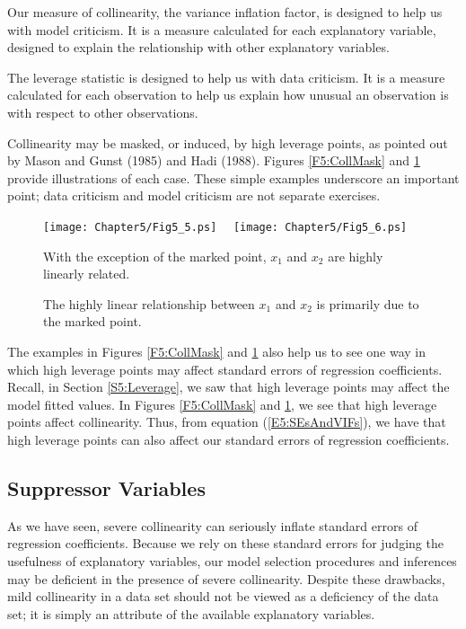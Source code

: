 Our measure of collinearity, the variance inflation factor, is designed to
help us with model criticism. It is a measure calculated for each
explanatory variable, designed to explain the relationship with other
explanatory variables.

The leverage statistic is designed to help us with data criticism. It is a
measure calculated for each observation to help us explain how unusual an
observation is with respect to other observations.

Collinearity may be masked, or induced, by high leverage points, as
pointed out by Mason and Gunst (1985) and Hadi (1988). Figures
\ref{F5:CollMask} and \ref{F5:CollInduce} provide illustrations of
each case. These simple examples underscore an important point; data
criticism and model criticism are not separate exercises.


\begin{figure}[htp]
    \texttt{[image: Chapter5/Fig5\_5.ps]}
    $~~~$
    \texttt{[image: Chapter5/Fig5\_6.ps]}    \hfill
      \parbox[t]{2.5in}{\caption{\label{F5:CollMask} \small  With the exception of
the marked point, $x_1$ and $x_2$ are highly linearly related.}}
\hfill
        \parbox[t]{2.5in}{ \caption{\label{F5:CollInduce} \small  The highly linear relationship
between $x_1$ and $x_2$ is primarily due to the marked point.}}
\end{figure}


The examples in Figures \ref{F5:CollMask} and \ref{F5:CollInduce}
also help us to see one way in which high leverage points may affect
standard errors of regression coefficients. Recall, in Section
\ref{S5:Leverage}, we saw that high leverage points may affect the
model fitted values. In Figures \ref{F5:CollMask} and
\ref{F5:CollInduce}, we see that high leverage points affect
collinearity. Thus, from equation (\ref{E5:SEsAndVIFs}), we have
that high leverage points can also affect our standard errors of
regression coefficients.

\subsection{Suppressor Variables}\label{S5:Suppressor}

As we have seen, severe collinearity can seriously inflate standard
errors of regression coefficients. Because we rely on these standard
errors for judging the usefulness of explanatory variables, our
model selection procedures and inferences may be deficient in the
presence of severe collinearity. Despite these drawbacks, mild
collinearity in a data set should not be viewed as a deficiency of
the data set; it is simply an attribute of the available explanatory
variables.

